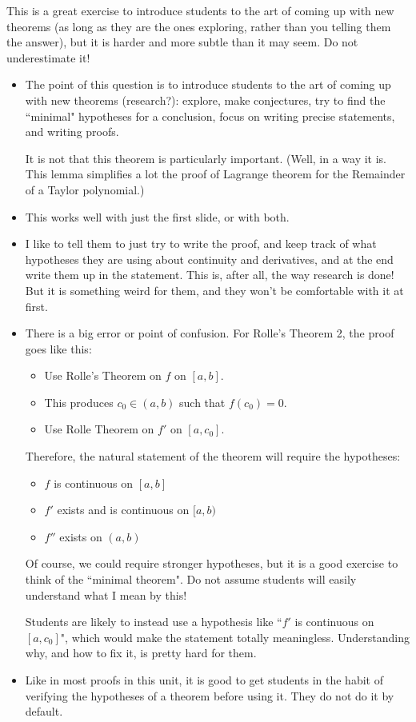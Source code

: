 \documentclass[11pt]{article}
\newcommand{\nl}{\hfill \vspace{-1.1\baselineskip}} %
\begin{document}
\begin{warning}
	This is a great exercise to introduce students to the art of coming up with new theorems (as long as they are the ones exploring, rather than you telling them the answer), but it is harder and more subtle than it may seem.  Do not underestimate it!
\end{warning}
\begin{comments}
\nl
\begin{itemize}
\item  The point of this question is to introduce students to the art of coming up with new theorems (research?): explore, make conjectures, try to find the ``minimal" hypotheses for a conclusion, focus on writing precise statements, and writing proofs.

  It is not that this theorem is particularly important.  (Well, in a way it is.  This lemma simplifies a lot the proof of Lagrange theorem for the Remainder of a Taylor polynomial.)
  
 \item This works well with just the first slide, or with both.
\item I like to tell them to just try to write the proof, and keep track of what hypotheses they are using about continuity and derivatives, and at the end write them up in the statement.  This is, after all, the way research is done!  But it is something weird for them, and they won't be comfortable with it at first.

\item There is a big error or point of confusion.    For Rolle's Theorem 2, the proof goes like this:
	\begin{itemize}
		\item Use Rolle's Theorem on $f$ on $[a,b]$. 
		\item This produces $c_0 \in (a,b)$ such that $f(c_0)=0$. 
		\item Use Rolle Theorem on $f'$ on $[a,c_0]$.
	\end{itemize}
	Therefore, the natural statement of the theorem will require the hypotheses:
	\begin{itemize}
		\item  $f$ is continuous on $[a,b]$
		\item  $f'$ exists and is continuous on $[a,b)$
		\item $f''$ exists on $(a,b)$
	\end{itemize}
	Of course, we could require stronger hypotheses, but it is a good exercise to think of the ``minimal theorem".  Do not assume students will easily understand what I mean by this!
	
	Students are likely to instead use a hypothesis like ``$f'$ is continuous on $[a,c_0]$", which would make the statement totally meaningless.  Understanding why, and how to fix it, is pretty hard for them.

\item Like in most proofs in this unit, it is good to get students in the habit of verifying the hypotheses of a theorem before using it.  They do not do it by default.

\end{itemize}	
\end{comments}
\end{document}
